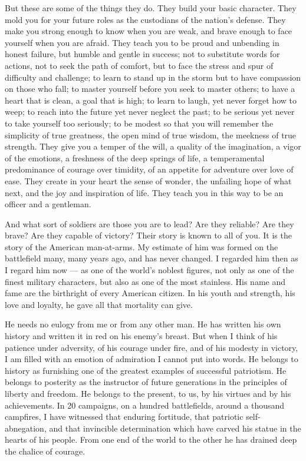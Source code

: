\documentclass[a4paper]{amsbook}
\begin{document}
But these are some of the things they do. They build your basic character. They mold you for your future roles as the custodians of the nation's defense. They make you strong enough to know when you are weak, and brave enough to face yourself when you are afraid. They teach you to be proud and unbending in honest failure, but humble and gentle in success; not to substitute words for actions, not to seek the path of comfort, but to face the stress and spur of difficulty and challenge; to learn to stand up in the storm but to have compassion on those who fall; to master yourself before you seek to master others; to have a heart that is clean, a goal that is high; to learn to laugh, yet never forget how to weep; to reach into the future yet never neglect the past; to be serious yet never to take yourself too seriously; to be modest so that you will remember the simplicity of true greatness, the open mind of true wisdom, the meekness of true strength. They give you a temper of the will, a quality of the imagination, a vigor of the emotions, a freshness of the deep springs of life, a temperamental predominance of courage over timidity, of an appetite for adventure over love of ease. They create in your heart the sense of wonder, the unfailing hope of what next, and the joy and inspiration of life. They teach you in this way to be an officer and a gentleman.

And what sort of soldiers are those you are to lead? Are they reliable? Are they brave? Are they capable of victory? Their story is known to all of you. It is the story of the American man-at-arms. My estimate of him was formed on the battlefield many, many years ago, and has never changed. I regarded him then as I regard him now — as one of the world's noblest figures, not only as one of the finest military characters, but also as one of the most stainless. His name and fame are the birthright of every American citizen. In his youth and strength, his love and loyalty, he gave all that mortality can give.

He needs no eulogy from me or from any other man. He has written his own history and written it in red on his enemy's breast. But when I think of his patience under adversity, of his courage under fire, and of his modesty in victory, I am filled with an emotion of admiration I cannot put into words. He belongs to history as furnishing one of the greatest examples of successful patriotism. He belongs to posterity as the instructor of future generations in the principles of liberty and freedom. He belongs to the present, to us, by his virtues and by his achievements. In 20 campaigns, on a hundred battlefields, around a thousand campfires, I have witnessed that enduring fortitude, that patriotic self-abnegation, and that invincible determination which have carved his statue in the hearts of his people. From one end of the world to the other he has drained deep the chalice of courage.
\end{document}
